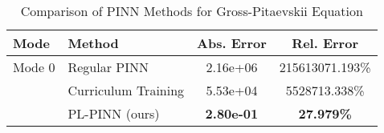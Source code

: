 \begin{table}[htbp]
\centering
\caption{Comparison of PINN Methods for Gross-Pitaevskii Equation}
\label{tab:pinn_comparison}
\begin{tabular}{llcc}
\toprule
Mode & Method & Abs. Error & Rel. Error \\
\midrule
Mode 0 & Regular PINN & 2.16e+06 & 215613071.193\% \\
 & Curriculum Training & 5.53e+04 & 5528713.338\% \\
 & PL-PINN (ours) & \textbf{2.80e-01} & \textbf{27.979\%} \\
\bottomrule
\end{tabular}
\end{table}